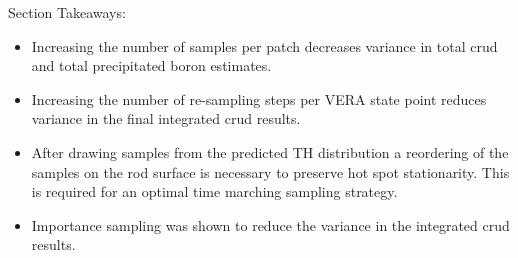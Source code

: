 Section Takeaways:
\begin{itemize}
	\item Increasing the number of samples per patch decreases variance in total crud and total precipitated boron estimates.
	\item Increasing the number of re-sampling steps per VERA state point reduces variance in the final integrated crud results.
    \item After drawing samples from the predicted TH distribution a reordering of the samples on the rod surface is necessary to preserve hot spot stationarity.  This is required for an optimal time marching sampling strategy.
    \item Importance sampling was shown to reduce the variance in the integrated crud results.
\end{itemize}
